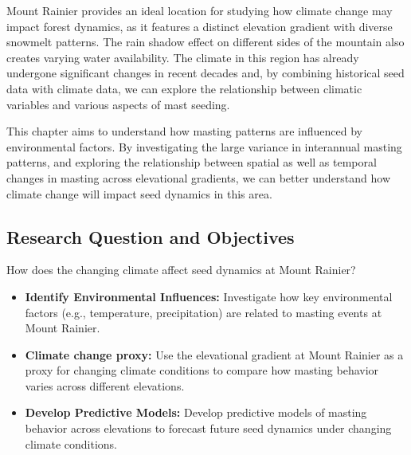 \documentclass[11pt,letter]{article}
\begin{document}
Mount Rainier provides an ideal location for studying how climate change may impact forest dynamics, as it features a distinct elevation gradient with diverse snowmelt patterns. The rain shadow effect on different sides of the mountain also creates varying water availability. The climate in this region has already undergone significant changes in recent decades and, by combining historical seed data with climate data, we can explore the relationship between climatic variables and various aspects of mast seeding.

This chapter aims to understand how masting patterns are influenced by environmental factors. By investigating the large variance in interannual masting patterns, and exploring the relationship between spatial as well as temporal changes in masting across elevational gradients, we can better understand how climate change will impact seed dynamics in this area.

\subsection{Research Question and Objectives}
How does the changing climate affect seed dynamics at Mount Rainier?
\begin{itemize}
\item\textbf{Identify Environmental Influences:} Investigate how key environmental factors (e.g., temperature, precipitation) are related to masting events at Mount Rainier.
\item\textbf{Climate change proxy:} Use the elevational gradient at Mount Rainier as a proxy for changing climate conditions to compare how masting behavior varies across different elevations.
\item\textbf{Develop Predictive Models:} Develop predictive models of masting behavior across elevations to forecast future seed dynamics under changing climate conditions.
\end{itemize}
\end{document}
